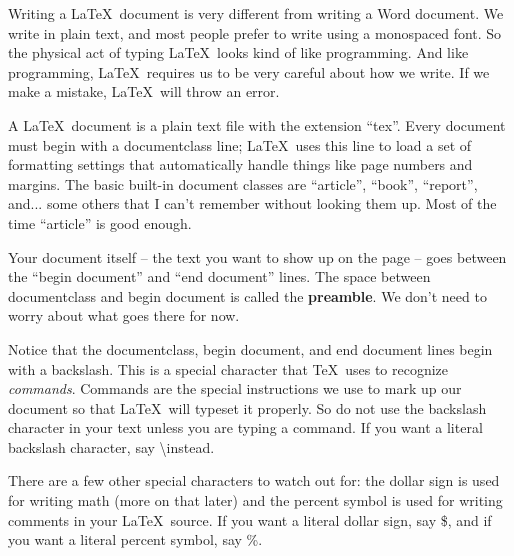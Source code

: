 \documentclass{article}
\begin{document}
Writing a \LaTeX\ document is very different from writing a Word document. We write in plain text, and most people prefer to write using a monospaced font. So the physical act of typing \LaTeX\ looks kind of like programming. And like programming, \LaTeX\ requires us to be very careful about how we write. If we make a mistake, \LaTeX\ will throw an error.

A \LaTeX\ document is a plain text file with the extension ``tex''. Every document must begin with a documentclass line; \LaTeX\ uses this line to load a set of formatting settings that automatically handle things like page numbers and margins. The basic built-in document classes are ``article'', ``book'', ``report'', and... some others that I can't remember without looking them up. Most of the time ``article'' is good enough.

Your document itself -- the text you want to show up on the page -- goes between the ``begin document'' and ``end document'' lines. The space between documentclass and begin document is called the \textbf{preamble}. We don't need to worry about what goes there for now.

Notice that the documentclass, begin document, and end document lines begin with a backslash. This is a special character that \TeX\ uses to recognize \emph{commands}. Commands are the special instructions we use to mark up our document so that \LaTeX\ will typeset it properly. So do not use the backslash character in your text unless you are typing a command. If you want a literal backslash character, say \textbackslash instead.

There are a few other special characters to watch out for: the dollar sign is used for writing math (more on that later) and the percent symbol is used for writing comments in your \LaTeX\ source. If you want a literal dollar sign, say \$, and if you want a literal percent symbol, say \%.
\end{document}
